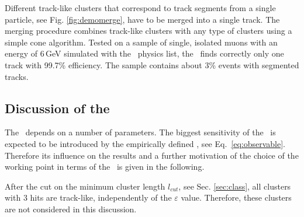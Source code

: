 Different track-like clusters that correspond to track segments from a single particle, see Fig. \ref{fig:demomerge}, have to be merged into a single track. 
The merging procedure combines track-like clusters with any type of clusters using a simple cone algorithm.
Tested on a sample of single, isolated muons with an energy of 6\,GeV simulated with the \ftfp\ physics list, the \tfa\ finds correctly only one track with 99.7\% efficiency. The sample contains about 3\% events with segmented tracks. 



\subsection{Discussion of the \ep }
\label{sec:systematics}


The \tfa\ depends on a number of parameters. The biggest sensitivity of the \tfa\ is expected to be introduced by the empirically defined \ep, see Eq.~\ref{eq:observable}. 
Therefore its influence on the results and a further motivation of the choice of the working point in terms of the \ep\, is given in the following. 

After the cut on the minimum cluster length $l_{cut}$, see Sec. \ref{sec:class}, all clusters with 3 hits are track-like, independently of the $\varepsilon$ value.
Therefore, these clusters are not considered in this discussion. 

